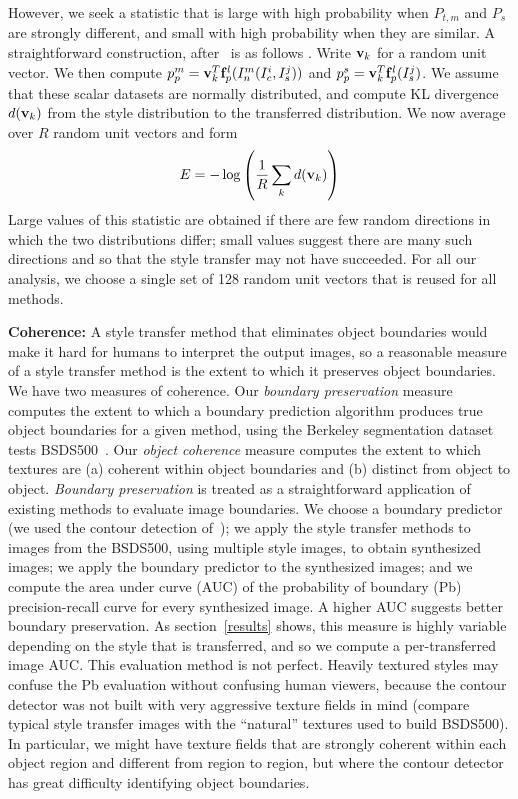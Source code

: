 \documentclass[runningheads]{llncs}
\newcommand{\vect}[1]{{\bf {#1}}}
\begin{document}
However, we seek a statistic that is large with high probability when $P_{t,m}$ and $P_s$ are strongly 
different, and small with high probability when they are similar.  A straightforward construction, 
after~\cite{DeshpandeCVPR2018} is as follows .
Write $\vect{v}_k$ for a random unit vector.  We then compute
$p_p^m=\vect{v}_k^T\vect{f}_p^{l}(I^m_n(I_c^i,I_s^j))$ and $p_p^s=\vect{v}_k^T\vect{f}_p^{l}(I_s^j)$.  We assume that
these scalar datasets are normally distributed, and compute KL divergence $d(\vect{v}_k)$ from the style distribution to the transferred
distribution.  We now average over $R$ random unit vectors and form
\[
E=-\log \left(\frac{1}{R} \sum_{k}d(\vect{v}_k)\right)
                     \]                   
Large values of this statistic are obtained if there are few random directions in which the two distributions 
differ; small values suggest there are many such directions and so that the style transfer may not 
have succeeded. For all our analysis, we choose a single set of 128 random unit vectors that is reused for all methods.

{\bf Coherence:} A style transfer method that eliminates object boundaries would make it hard for humans to interpret
the output images, so a reasonable measure of a style transfer method is the extent to which it preserves object
boundaries.  We have two measures of coherence.  Our {\em boundary preservation} measure computes the extent to which a
boundary prediction algorithm produces true object boundaries for a given method, using the Berkeley segmentation dataset tests BSDS500~\cite{arbelaez2011contour}.  Our {\em object coherence} measure computes the extent to which textures are (a) coherent within object boundaries and (b) distinct from object to object.
{\em Boundary preservation} is treated as a straightforward application of existing methods to evaluate image boundaries.  We choose a boundary predictor (we used the contour detection of~\cite{arbelaez2011contour}); we apply the style transfer methods to images
from the BSDS500, using multiple style images, to obtain synthesized images; we apply the boundary predictor to the synthesized images; and we compute the area under curve (AUC) of the  probability of boundary (Pb) precision-recall curve for every synthesized image.  A higher AUC suggests better boundary
preservation.  As section~\ref{results} shows, this measure is highly variable depending on the style that is transferred, and so we compute a per-transferred image AUC. This evaluation method is not perfect.  Heavily textured styles may confuse the Pb evaluation without confusing human viewers, because the contour detector was not built with very aggressive texture fields in  mind (compare typical style transfer images with the  ``natural'' textures used to build BSDS500).  In particular, we might have texture fields that are strongly coherent within each object region and different from region to region, but where the contour detector has great difficulty identifying object boundaries. 
\end{document}
